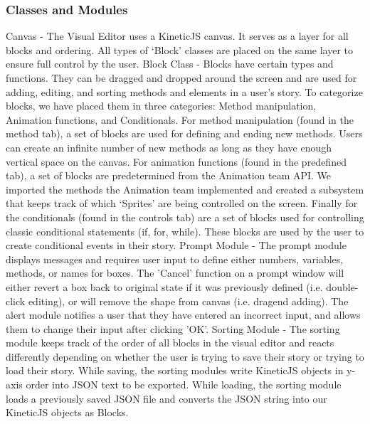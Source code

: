 \documentclass[a4paper]{article}
\begin{document}
\subsubsection{Classes and Modules}
Canvas - The Visual Editor uses a KineticJS canvas. It serves as a layer for all blocks and ordering. All types of `Block' classes are placed on the same layer to ensure full control by the user. \newline \newline
Block Class - Blocks have certain types and functions. They can be dragged and dropped around the screen and are used for adding, editing, and sorting methods and elements in a user's story. To categorize blocks, we have placed them in three categories: Method manipulation, Animation functions, and Conditionals. For method manipulation (found in the method tab), a set of blocks are used for defining and ending new methods. Users can create an infinite number of new methods as long as they have enough vertical space on the canvas. For animation functions (found in the predefined tab), a set of blocks are predetermined from the Animation team API. We imported the methods the Animation team implemented and created a subsystem that keeps track of which `Sprites' are being controlled on the screen. Finally for the conditionals (found in the controls tab) are a set of blocks used for controlling classic conditional statements (if, for, while). These blocks are used by the user to create conditional events in their story.\newline \newline
Prompt Module - The prompt module displays messages and requires user input to define either numbers, variables, methods, or names for boxes. The 'Cancel' function on a prompt window will either revert a box back to original state if it was previously defined (i.e. double-click editing), or will remove the shape from canvas (i.e. dragend adding). The alert module notifies a user that they have entered an incorrect input, and allows them to change their input after clicking 'OK'. \newline \newline
Sorting Module - The sorting module keeps track of the order of all blocks in the visual editor and reacts differently depending on whether the user is trying to save their story or trying to load their story. While saving, the sorting modules write KineticJS objects in y-axis order into JSON text to be exported. While loading, the sorting module loads a previously saved JSON file and converts the JSON string into our KineticJS objects as Blocks.
\end{document}
